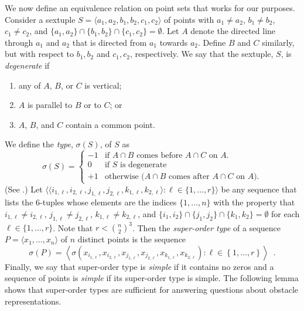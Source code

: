\documentclass{patmorin}
\begin{document}
We now define an equivalence relation on point sets that works for our
purposes.  Consider a sextuple $S=\langle a_1,a_2,b_1,b_2,c_1,c_2\rangle$
of points with $a_1\neq a_2$, $b_1\neq b_2$, $c_1\neq c_2$, and 
$\{a_1,a_2\}\cap\{b_1,b_2\}\cap\{c_1,c_2\}=\emptyset$.  Let $A$
denote the directed line through $a_1$ and $a_2$ that is directed from
$a_1$ towards $a_2$. Define $B$ and $C$ similarly, but with respect to
$b_1,b_2$ and $c_1,c_2$, respectively.  We say that the sextuple, $S$,
is \emph{degenerate} if
\begin{enumerate}
  \item any of $A$, $B$, or $C$ is vertical;
  \item $A$ is parallel to $B$ or to $C$; or
  \item $A$, $B$, and $C$ contain a common point.
\end{enumerate}
We define the \emph{type}, $\sigma(S)$, of $S$ as
\[
    \sigma(S) = \left\{\begin{array}{rl}
      -1 & \text{if $A\cap B$ comes before $A\cap C$ on $A$.} \\
      0 & \text{if $S$ is degenerate} \\
      +1 & \text{otherwise ($A\cap B$ comes after $A\cap C$ on $A$).} 
    \end{array}\right.
\]
(See .)  Let $\langle\langle
i_{1,\ell},i_{2,\ell},j_{1,\ell},j_{2,\ell},k_{1,\ell},k_{2,\ell}\rangle:
\ell \in \{1,\ldots,r\}\rangle$ be any sequence that lists the
6-tuples whose elements are the indices $\{1,\ldots,n\}$ with the property
that $i_{1,\ell}\neq i_{2,\ell}$, $j_{1,\ell}\neq j_{2,\ell}$,
$k_{1,\ell}\neq k_{2,\ell}$, and $\{i_1,i_2\}\cap\{j_1,j_2\}\cap\{k_1,k_2\}=\emptyset$ for each $\ell\in\{1,\ldots,r\}$.  Note that $r< \binom{n}{2}^3$.
Then the \emph{super-order type} of a sequence 
$P=\langle x_1,\ldots,x_n\rangle$ of $n$ distinct points is the sequence
\[
   \sigma(P) = \left\langle \sigma\left(x_{i_{1,\ell}},x_{i_{2,\ell}},
       x_{j_{1,\ell}},x_{j_{2,\ell}},
       x_{k_{1,\ell}},x_{k_{2,\ell}}\right) : \ell\in\left\{1,\ldots,r\right\} \right\rangle \enspace .
\]
Finally, we say that super-order type is \emph{simple} if it contains
no zeros and a sequence of points is \emph{simple} if its super-order
type is simple.
The following lemma shows that super-order types are sufficient for answering
questions about obstacle representations.
\end{document}
